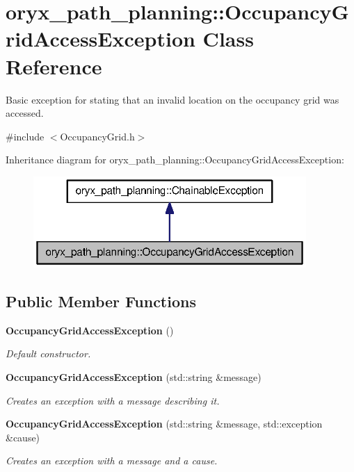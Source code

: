 \section{oryx\-\_\-path\-\_\-planning\-:\-:\-Occupancy\-Grid\-Access\-Exception \-Class \-Reference}
\label{classoryx__path__planning_1_1OccupancyGridAccessException}


\-Basic exception for stating that an invalid location on the occupancy grid was accessed.  




{\ttfamily \#include $<$\-Occupancy\-Grid.\-h$>$}



\-Inheritance diagram for oryx\-\_\-path\-\_\-planning\-:\-:\-Occupancy\-Grid\-Access\-Exception\-:
\nopagebreak
\begin{figure}[H]
\begin{center}
\leavevmode
\includegraphics[width=294pt]{classoryx__path__planning_1_1OccupancyGridAccessException__inherit__graph}
\end{center}
\end{figure}
\subsection*{\-Public \-Member \-Functions}
\begin{DoxyCompactItemize}
\item 
{\bf \-Occupancy\-Grid\-Access\-Exception} ()
\begin{DoxyCompactList}\small\item\em \-Default constructor. \end{DoxyCompactList}\item 
{\bf \-Occupancy\-Grid\-Access\-Exception} (std\-::string \&message)
\begin{DoxyCompactList}\small\item\em \-Creates an exception with a message describing it. \end{DoxyCompactList}\item 
{\bf \-Occupancy\-Grid\-Access\-Exception} (std\-::string \&message, std\-::exception \&cause)
\begin{DoxyCompactList}\small\item\em \-Creates an exception with a message and a cause. \end{DoxyCompactList}\end{DoxyCompactItemize}



